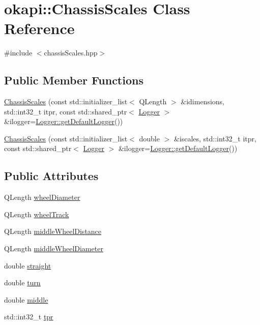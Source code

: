 \hypertarget{classokapi_1_1ChassisScales}{}\section{okapi\+::Chassis\+Scales Class Reference}
\label{classokapi_1_1ChassisScales}


{\ttfamily \#include $<$chassis\+Scales.\+hpp$>$}

\subsection*{Public Member Functions}
\begin{DoxyCompactItemize}
\item 
\mbox{\hyperlink{classokapi_1_1ChassisScales_a12c534b3782cabe8fcfc12620ceb5b7e}{Chassis\+Scales}} (const std\+::initializer\+\_\+list$<$ Q\+Length $>$ \&idimensions, std\+::int32\+\_\+t itpr, const std\+::shared\+\_\+ptr$<$ \mbox{\hyperlink{classokapi_1_1Logger}{Logger}} $>$ \&ilogger=\mbox{\hyperlink{classokapi_1_1Logger_a5053cf778b4b55acba788a3797dc96d2}{Logger\+::get\+Default\+Logger}}())
\item 
\mbox{\hyperlink{classokapi_1_1ChassisScales_afde0418a58dc7ff688a4bde5b20ea923}{Chassis\+Scales}} (const std\+::initializer\+\_\+list$<$ double $>$ \&iscales, std\+::int32\+\_\+t itpr, const std\+::shared\+\_\+ptr$<$ \mbox{\hyperlink{classokapi_1_1Logger}{Logger}} $>$ \&ilogger=\mbox{\hyperlink{classokapi_1_1Logger_a5053cf778b4b55acba788a3797dc96d2}{Logger\+::get\+Default\+Logger}}())
\end{DoxyCompactItemize}
\subsection*{Public Attributes}
\begin{DoxyCompactItemize}
\item 
Q\+Length \mbox{\hyperlink{classokapi_1_1ChassisScales_a08c7c4f04b6906683a056077cce18ba0}{wheel\+Diameter}}
\item 
Q\+Length \mbox{\hyperlink{classokapi_1_1ChassisScales_af2e0c71b9daa9d4345de83967f9bf9c9}{wheel\+Track}}
\item 
Q\+Length \mbox{\hyperlink{classokapi_1_1ChassisScales_ab3b646546992e60d5b05d222b7f7f7c7}{middle\+Wheel\+Distance}}
\item 
Q\+Length \mbox{\hyperlink{classokapi_1_1ChassisScales_a0fc8563377e9f4c17a111b000d58e87b}{middle\+Wheel\+Diameter}}
\item 
double \mbox{\hyperlink{classokapi_1_1ChassisScales_aaf1ec10f7cfa955d6d8eaa2b16dd345f}{straight}}
\item 
double \mbox{\hyperlink{classokapi_1_1ChassisScales_aa4babba4794c8f61d41ef6282ba94b64}{turn}}
\item 
double \mbox{\hyperlink{classokapi_1_1ChassisScales_a32b8be3c63099900a27d816b47713930}{middle}}
\item 
std\+::int32\+\_\+t \mbox{\hyperlink{classokapi_1_1ChassisScales_a9b6fa5ed7d24669f173d6439920890f2}{tpr}}
\end{DoxyCompactItemize}
